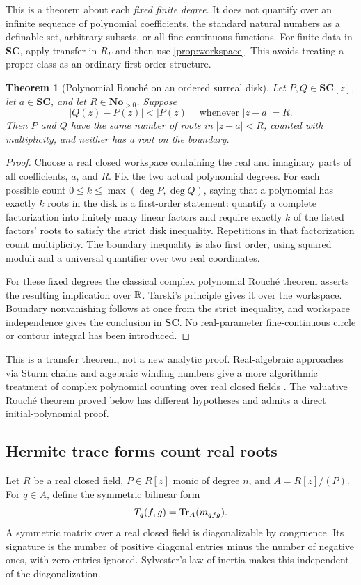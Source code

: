 \documentclass[11pt,letterpaper,oneside]{article}
\numberwithin{equation}{section}
\newtheorem{theorem}{Theorem}[section]
\theoremstyle{definition}
\theoremstyle{remark}\newtheorem{remark}[theorem]{Remark}
\newcommand{\No}{\mathbf{No}}\newcommand{\SC}{\mathbf{SC}}
\begin{document}
This is a theorem about each \emph{fixed finite degree}. It does not
quantify over an infinite sequence of polynomial coefficients, the
standard natural numbers as a definable set, arbitrary subsets, or all
fine-continuous functions. For finite data in $\SC$, apply transfer in
$R_\Gamma$ and then use \cref{prop:workspace}. This avoids treating a
proper class as an ordinary first-order structure.

\begin{theorem}[Polynomial Rouch\'e on an ordered surreal disk]\label{thm:orderedrouche}
Let $P,Q\in\SC[z]$, let $a\in\SC$, and let $R\in\No_{>0}$. Suppose
\[
 |Q(z)-P(z)|<|P(z)|\quad\text{whenever }|z-a|=R.
\]
Then $P$ and $Q$ have the same number of roots in $|z-a|<R$, counted
with multiplicity, and neither has a root on the boundary.
\end{theorem}
\begin{proof}
Choose a real closed workspace containing the real and imaginary parts
of all coefficients, $a$, and $R$. Fix the two actual polynomial degrees.
For each possible count $0\leq k\leq\max(\deg P,\deg Q)$, saying
that a polynomial has exactly $k$ roots in the disk is a first-order
statement: quantify a complete factorization into finitely many linear
factors and require exactly $k$ of the listed factors' roots to satisfy
the strict disk inequality. Repetitions in that factorization count
multiplicity. The boundary inequality is also first order, using squared
moduli and a universal quantifier over two real coordinates.

For these fixed degrees the classical complex polynomial Rouch\'e theorem
asserts the resulting implication over $\mathbb R$. Tarski's principle gives
it over the workspace. Boundary nonvanishing follows at once from the
strict inequality, and workspace independence gives the conclusion in
$\SC$. No real-parameter fine-continuous circle or contour integral has
been introduced.
\end{proof}

This is a transfer theorem, not a new analytic proof. Real-algebraic
approaches via Sturm chains and algebraic winding numbers give a more
algorithmic treatment of complex polynomial counting over real closed
fields \cite{Eisermann}. The valuative Rouch\'e theorem proved below has
different hypotheses and admits a direct initial-polynomial proof.

\subsection{Hermite trace forms count real roots}
Let $R$ be a real closed field, $P\in R[z]$ monic of degree $n$, and
$A=R[z]/(P)$. For $q\in A$, define the symmetric bilinear form
\begin{equation}\label{eq:hermiteform}
 T_q(f,g)=\operatorname{Tr}_A(m_{qfg}).
\end{equation}
A symmetric matrix over a real closed field is diagonalizable by
congruence. Its signature is the number of positive diagonal entries
minus the number of negative ones, with zero entries ignored. Sylvester's
law of inertia makes this independent of the diagonalization.
\end{document}
